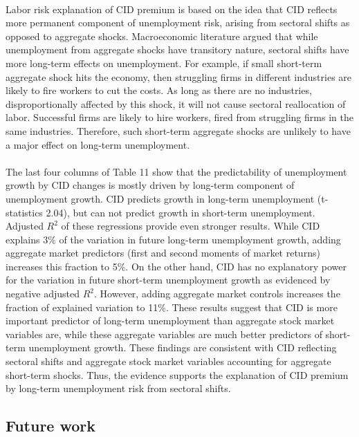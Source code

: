 \documentclass[12pt]{article}
\begin{document}
\paragraph{}
Labor risk explanation of CID premium is based on the idea that CID reflects more permanent component of unemployment risk, arising from sectoral shifts as opposed to aggregate shocks. Macroeconomic literature argued that while unemployment from aggregate shocks have transitory nature, sectoral shifts have more long-term effects on unemployment. For example, if small short-term aggregate shock hits the economy, then struggling firms in different industries are likely to fire workers to cut the costs. As long as there are no industries, disproportionally affected by this shock, it will not cause sectoral reallocation of labor. Successful firms are likely to hire workers, fired from struggling firms in the same industries. Therefore, such short-term aggregate shocks are unlikely to have a major effect on long-term unemployment.
\paragraph{}
The last four columns of Table 11 show that the predictability of unemployment growth by CID changes is mostly driven by long-term component of unemployment growth. CID predicts growth in long-term unemployment (t-statistics 2.04), but can not predict growth in short-term unemployment. Adjusted $R^2$ of these regressions provide even stronger results. While CID explains 3\% of the variation in future long-term unemployment growth, adding aggregate market predictors (first and second moments of market returns) increases this fraction to 5\%. On the other hand, CID has no explanatory power for the variation in future short-term unemployment growth  as evidenced by negative adjusted $R^2$. However, adding aggregate market controls increases the fraction of explained variation to 11\%. These results suggest that CID is more important predictor of long-term unemployment than aggregate stock market variables are, while these aggregate variables are much better predictors of short-term unemployment growth. These findings are consistent with CID reflecting sectoral shifts and aggregate stock market variables accounting for aggregate short-term shocks. Thus, the evidence supports the explanation of CID premium by long-term unemployment risk from sectoral shifts.

\subsection{Future work}
\end{document}
